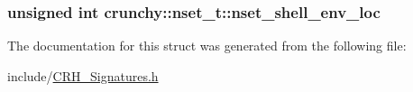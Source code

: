 \subsubsection[{nset\+\_\+shell\+\_\+env\+\_\+loc}]{\setlength{\rightskip}{0pt plus 5cm}unsigned int crunchy\+::nset\+\_\+t\+::nset\+\_\+shell\+\_\+env\+\_\+loc}\hypertarget{structcrunchy_1_1nset__t_ad915c66f77d295650d514a6804a662d2}{}\label{structcrunchy_1_1nset__t_ad915c66f77d295650d514a6804a662d2}


The documentation for this struct was generated from the following file\+:\begin{DoxyCompactItemize}
\item 
include/\hyperlink{_c_r_h___signatures_8h}{C\+R\+H\+\_\+\+Signatures.\+h}\end{DoxyCompactItemize}
